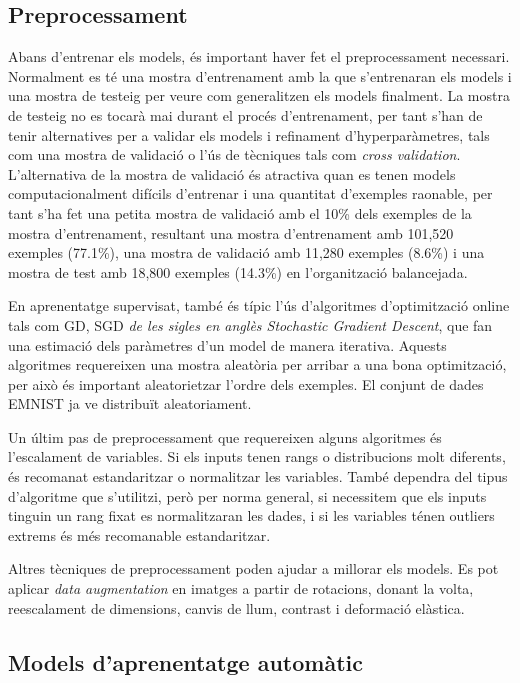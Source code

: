 \documentclass[12pt, spanish]{article}
\begin{document}
\subsection{Preprocessament}

Abans d'entrenar els models, és important haver fet el preprocessament necessari. Normalment es té una mostra d'entrenament amb la que s'entrenaran els models i una mostra de testeig per veure com generalitzen els models finalment. La mostra de testeig no es tocarà mai durant el procés d'entrenament, per tant s'han de tenir alternatives per a validar els models i refinament d'hyperparàmetres, tals com una mostra de validació o l'ús de tècniques tals com \textit{cross validation}. L'alternativa de la mostra de validació és atractiva quan es tenen models computacionalment difícils d'entrenar i una quantitat d'exemples raonable, per tant s'ha fet una petita mostra de validació amb el 10\% dels exemples de la mostra d'entrenament, resultant una mostra d'entrenament amb 101,520 exemples (77.1\%), una mostra de validació amb 11,280 exemples (8.6\%) i una mostra de test amb 18,800 exemples (14.3\%) en l'organització balancejada.

En aprenentatge supervisat, també és típic l'ús d'algoritmes d'optimització online tals com GD, SGD \textit{de les sigles en anglès \textit{Stochastic Gradient Descent}}, que fan una estimació dels paràmetres d'un model de manera iterativa. Aquests algoritmes requereixen una mostra aleatòria per arribar a una bona optimització, per això és important aleatorietzar l'ordre dels exemples. El conjunt de dades EMNIST ja ve distribuït aleatoriament. 

Un últim pas de preprocessament que requereixen alguns algoritmes és l'escalament de variables. Si els inputs tenen rangs o distribucions molt diferents, és recomanat estandaritzar o normalitzar les variables. També dependra del tipus d'algoritme que s'utilitzi, però per norma general, si necessitem que els inputs tinguin un rang fixat es normalitzaran les dades, i si les variables ténen outliers extrems és més recomanable estandaritzar.

Altres tècniques de preprocessament poden ajudar a millorar els models. Es pot aplicar \textit{data augmentation} en imatges a partir de rotacions, donant la volta, reescalament de dimensions, canvis de llum, contrast i deformació elàstica.


\subsection{Models d'aprenentatge automàtic}
\end{document}
